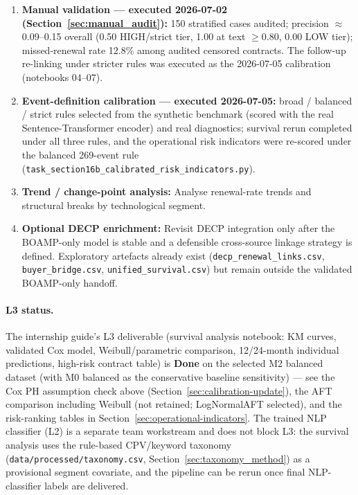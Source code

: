 \documentclass[12pt, a4paper]{article}
\begin{document}
\begin{enumerate}
  \item \textbf{Manual validation --- executed 2026-07-02
        (Section~\ref{sec:manual_audit}):} 150 stratified cases audited;
        precision $\approx$0.09--0.15 overall (0.50 HIGH/strict tier, 1.00 at
        text $\geq$0.80, 0.00 LOW tier); missed-renewal rate 12.8\% among
        audited censored contracts. The follow-up re-linking under stricter
        rules was executed as the 2026-07-05 calibration (notebooks 04--07).
  \item \textbf{Event-definition calibration --- executed 2026-07-05:} broad /
        balanced / strict rules selected from the synthetic benchmark (scored
        with the real Sentence-Transformer encoder) and real diagnostics;
        survival rerun completed under all three rules, and the operational
        risk indicators were re-scored under the balanced 269-event rule
        (\texttt{task\_section16b\_calibrated\_risk\_indicators.py}).
  \item \textbf{Trend / change-point analysis:} Analyse renewal-rate trends and structural
        breaks by technological segment.
  \item \textbf{Optional DECP enrichment:} Revisit DECP integration only after the BOAMP-only
        model is stable and a defensible cross-source linkage strategy is defined. Exploratory
        artefacts already exist (\texttt{decp\_renewal\_links.csv}, \texttt{buyer\_bridge.csv},
        \texttt{unified\_survival.csv}) but remain outside the validated BOAMP-only handoff.
\end{enumerate}

\paragraph*{L3 status.} The internship guide's L3 deliverable (survival
analysis notebook: KM curves, validated Cox model, Weibull/parametric
comparison, 12/24-month individual predictions, high-risk contract table) is
\textbf{Done} on the selected M2 balanced dataset (with M0 balanced as the conservative baseline sensitivity) --- see the Cox PH
assumption check above (Section~\ref{sec:calibration-update}), the AFT comparison
including Weibull (not retained; LogNormalAFT selected), and the risk-ranking
tables in Section~\ref{sec:operational-indicators}. The trained NLP classifier
(L2) is a separate team workstream and does not block L3: the survival
analysis uses the rule-based CPV/keyword taxonomy
(\texttt{data/processed/taxonomy.csv}, Section~\ref{sec:taxonomy_method}) as a
provisional segment covariate, and the pipeline can be rerun once final
NLP-classifier labels are delivered.
\end{document}
